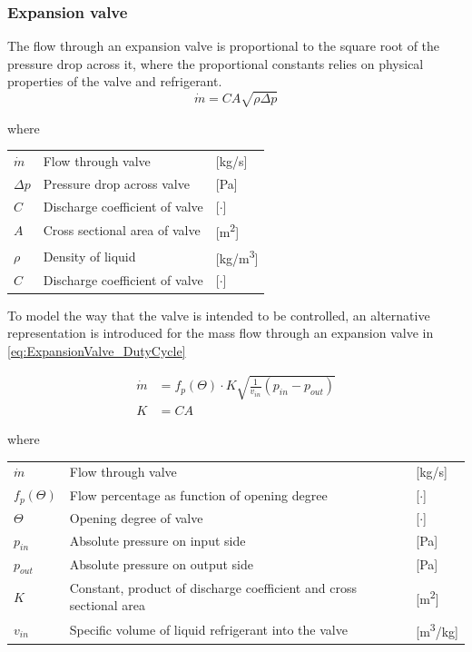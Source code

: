 \subsubsection{Expansion valve}
The flow through an expansion valve is proportional to the square root of the pressure drop across it, where the proportional constants relies on physical properties of the valve and refrigerant.
\begin{equation} \label{eq:ExpansionValve}
	\dot{m}= C A \sqrt{\rho\Delta p}
\end{equation}

where
\begin{center}
	\begin{tabular}{l p{8cm} l}
		$\dot{m}$ 	& Flow through valve & [\si{kg}/\si{s}]\\
		$\Delta p$ 	& Pressure drop across valve & [\si{Pa}]\\
		$C$ 		& Discharge coefficient of valve & [$\cdot$]\\
		$A$	 		& Cross sectional area of valve & [\si{m^2}]\\
		$\rho$ 		& Density of liquid & [\si{kg}/\si{m^3}]\\
			$C$ 	& Discharge coefficient of valve & [$\cdot$]\\
	\end{tabular}
\end{center}

To model the way that the valve is intended to be controlled, an alternative representation is introduced for the mass flow through an expansion valve in \cref{eq:ExpansionValve_DutyCycle}


\begin{equation} \label{eq:ExpansionValve_DutyCycle}
	\begin{split}
		\dot{m} &= f_p(\Theta) \cdot K  \sqrt{\frac{1}{v_{in}} (p_{in} - p_{out})}\\
		K 			&= C A
	\end{split}
\end{equation}

where
\begin{center}
	\begin{tabular}{l p{8cm} l}
		$\dot{m}$     & Flow through valve                                                  & [\si{kg}/\si{s}]   \\
		$f_p(\Theta)$ & Flow percentage as function of opening degree                       & [$\cdot$]          \\
		$ \Theta $    & Opening degree of valve                                             & [$ \cdot $]        \\
		$p_{in}$      & Absolute pressure on input side                                     & [\si{Pa}]          \\
		$p_{out}$     & Absolute pressure on output side                                    & [\si{Pa}]          \\
		$K$           & Constant, product of discharge coefficient and cross sectional area & [\si{m^2}]         \\
		$v_{in}$      & Specific volume of liquid refrigerant into the valve                & [\si{m^3}/\si{kg}]
	\end{tabular}
\end{center}

